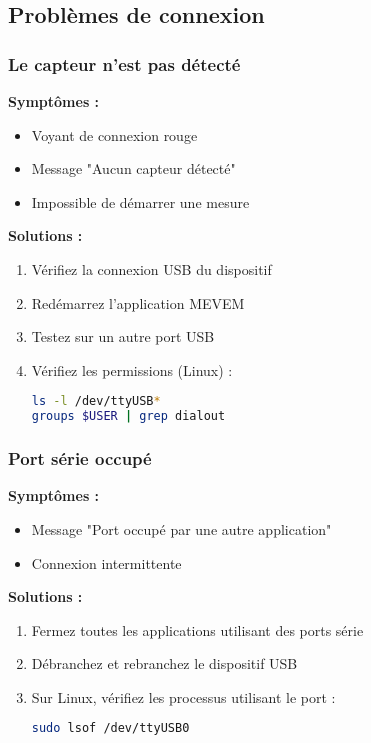 \documentclass[12pt,a4paper]{article}
\begin{document}
\subsection{Problèmes de connexion}

\subsubsection{Le capteur n'est pas détecté}

\textbf{Symptômes :}
\begin{itemize}
    \item Voyant de connexion rouge
    \item Message "Aucun capteur détecté"
    \item Impossible de démarrer une mesure
\end{itemize}

\textbf{Solutions :}
\begin{enumerate}
    \item Vérifiez la connexion USB du dispositif
    \item Redémarrez l'application MEVEM
    \item Testez sur un autre port USB
    \item Vérifiez les permissions (Linux) :
    \begin{lstlisting}[language=bash]
ls -l /dev/ttyUSB*
groups $USER | grep dialout
    \end{lstlisting}
\end{enumerate}

\subsubsection{Port série occupé}

\textbf{Symptômes :}
\begin{itemize}
    \item Message "Port occupé par une autre application"
    \item Connexion intermittente
\end{itemize}

\textbf{Solutions :}
\begin{enumerate}
    \item Fermez toutes les applications utilisant des ports série
    \item Débranchez et rebranchez le dispositif USB
    \item Sur Linux, vérifiez les processus utilisant le port :
    \begin{lstlisting}[language=bash]
sudo lsof /dev/ttyUSB0
    \end{lstlisting}
\end{enumerate}
\end{document}
